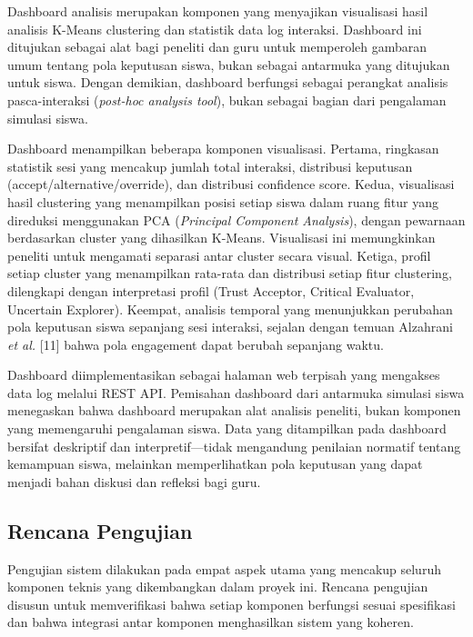 \documentclass[12pt,oneside]{report}
\begin{document}
Dashboard analisis merupakan komponen yang menyajikan visualisasi hasil analisis K-Means clustering dan statistik data log interaksi. Dashboard ini ditujukan sebagai alat bagi peneliti dan guru untuk memperoleh gambaran umum tentang pola keputusan siswa, bukan sebagai antarmuka yang ditujukan untuk siswa. Dengan demikian, dashboard berfungsi sebagai perangkat analisis pasca-interaksi (\textit{post-hoc analysis tool}), bukan sebagai bagian dari pengalaman simulasi siswa.

Dashboard menampilkan beberapa komponen visualisasi. Pertama, ringkasan statistik sesi yang mencakup jumlah total interaksi, distribusi keputusan (accept/alternative/override), dan distribusi confidence score. Kedua, visualisasi hasil clustering yang menampilkan posisi setiap siswa dalam ruang fitur yang direduksi menggunakan PCA (\textit{Principal Component Analysis}), dengan pewarnaan berdasarkan cluster yang dihasilkan K-Means. Visualisasi ini memungkinkan peneliti untuk mengamati separasi antar cluster secara visual. Ketiga, profil setiap cluster yang menampilkan rata-rata dan distribusi setiap fitur clustering, dilengkapi dengan interpretasi profil (Trust Acceptor, Critical Evaluator, Uncertain Explorer). Keempat, analisis temporal yang menunjukkan perubahan pola keputusan siswa sepanjang sesi interaksi, sejalan dengan temuan Alzahrani \textit{et al.} [11] bahwa pola engagement dapat berubah sepanjang waktu.

Dashboard diimplementasikan sebagai halaman web terpisah yang mengakses data log melalui REST API. Pemisahan dashboard dari antarmuka simulasi siswa menegaskan bahwa dashboard merupakan alat analisis peneliti, bukan komponen yang memengaruhi pengalaman siswa. Data yang ditampilkan pada dashboard bersifat deskriptif dan interpretif—tidak mengandung penilaian normatif tentang kemampuan siswa, melainkan memperlihatkan pola keputusan yang dapat menjadi bahan diskusi dan refleksi bagi guru.

\subsection{Rencana Pengujian}
\label{subsec:rencana-pengujian}

Pengujian sistem dilakukan pada empat aspek utama yang mencakup seluruh komponen teknis yang dikembangkan dalam proyek ini. Rencana pengujian disusun untuk memverifikasi bahwa setiap komponen berfungsi sesuai spesifikasi dan bahwa integrasi antar komponen menghasilkan sistem yang koheren.
\end{document}
